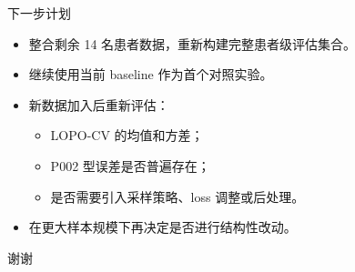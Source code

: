 \documentclass[
  presentation,
  titlegraphic=./images/bit_logo.pdf,
  framelogo=./images/bit_logo.pdf
]{bitbeamer}
\begin{document}
\begin{frame}[t]{下一步计划}
  \begin{itemize}
    \item 整合剩余 14 名患者数据，重新构建完整患者级评估集合。
    \item 继续使用当前 baseline 作为首个对照实验。
    \item 新数据加入后重新评估：
      \begin{itemize}
        \item LOPO-CV 的均值和方差；
        \item P002 型误差是否普遍存在；
        \item 是否需要引入采样策略、loss 调整或后处理。
      \end{itemize}
    \item 在更大样本规模下再决定是否进行结构性改动。
  \end{itemize}
\end{frame}

\begin{frame}[c]
  \centering
  \Huge 谢谢
\end{frame}
\end{document}

